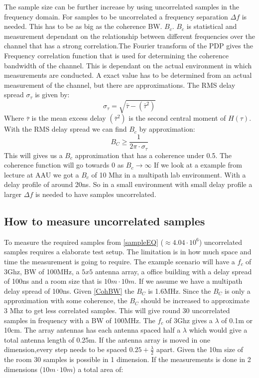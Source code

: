 The sample size can be further increase by using uncorrelated samples in the frequency domain. 
For samples to be uncorrelated a frequency separation $\Delta f$  is needed. This has to be as big as the coherence BW. $B_{c}$. $B_{c}$ is statistical and measurement dependant on the relationship between different frequencies over the channel that has a strong correlation.The Fourier transform of the PDP gives the Frequency correlation function that is used for determining the coherence bandwidth of the channel. This is dependant on the actual environment in which measurements are conducted. A exact value has to be determined from  an actual measurement of the channel, but there are approximations\citep{RayFadeHandbook}. The RMS delay spread $\sigma_{\tau}$ is given by:
\begin{equation}
\sigma_{\tau} = \sqrt{\bar{\tau} - {(\bar{\tau}^{2})}}
\end{equation}
Where $\bar{\tau}$ is the mean excess delay $(\bar{\tau}^{2})$ is 
the second central moment of $H(\tau)$. With the RMS delay spread we can find $B_c$ by approximation:
\begin{equation}
B_C \geq \frac{1}{2\pi \cdot \sigma_{\tau}}
\label{CohBW}
\end{equation}
This will gives us a $B_c$ approximation that has a coherence under 0.5. The coherence function will go towards 0 as $B_c  \rightarrow \infty $
\citep{CohBW}
If we look at a example from lecture at AAU we got a $B_c$ of 10 Mhz in a multipath lab environment.
 With a delay profile of around 20ns. So in a small environment with small delay profile a larger $\Delta f$ is needed to have samples uncorrelated.
\citep[Chapter 18.5]{ComHandbook}

\subsection{How to measure uncorrelated samples}
\label{howtomeasureUS}
To measure the required samples from \autoref{sampleEQ} ($\approx 4.04\cdot10^6$) uncorrelated samples requires a elaborate test setup. The limitation is in how much space and time the measurement is going to require. The example scenario  will have a $f_c$ of 3Ghz, BW of 100MHz, a $5x5$ antenna array, a office building with a delay spread of 100ns and a room size that is $10m \cdot 10m$.
If we assume we have a multipath delay spread of 100ns. Given \autoref{CohBW} the $B_C$ is 1.6MHz. Since the $B_C$ is only a approximation with some coherence, the $B_C$ should be increased to approximate 3 Mhz to get less correlated samples. This will give round 30 uncorrelated samples in frequency with a BW of 100MHz.
The $f_c$ of 3Ghz gives a $\lambda$ of 0.1m or 10cm. The array antennas has each antenna spaced half a $\lambda$ which would give a total antenna length of 0.25m. If the antenna array is moved in one dimension,every step needs to be spaced $0.25+\frac{\lambda}{2}$ apart. Given the 10m size of the room 30 samples is possible in 1 dimension. If the measurements is done in 2 dimensions ($10m\cdot 10m$) a total area of:

